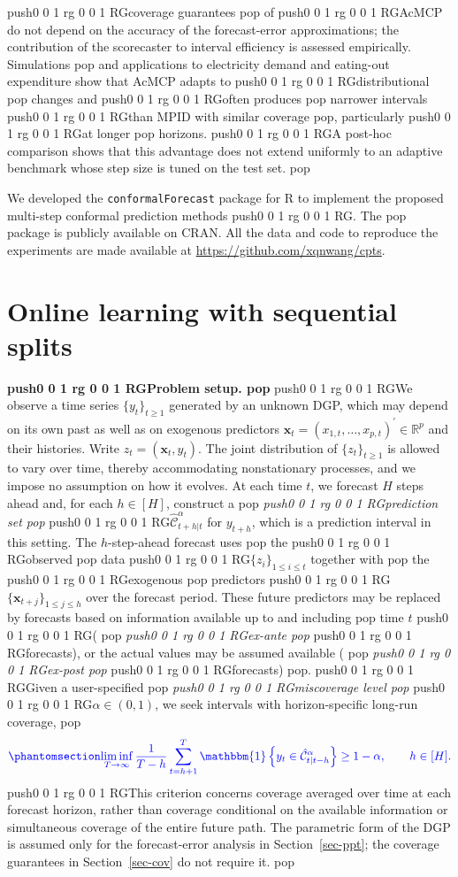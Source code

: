 \documentclass[
  american,
  12pt]{article}
\theoremstyle{plain}
\theoremstyle{plain}
\theoremstyle{remark}
\newcommand{\CPTSadd}[1]{\ifmmode\else\leavevmode\fi\pdfcolorstack 0 push{0 0 1 rg 0 0 1 RG}#1\pdfcolorstack 0 pop}
\begin{document}
\CPTSadd{coverage guarantees} of \CPTSadd{AcMCP do not depend on the accuracy of the
forecast-error approximations; the contribution of the scorecaster to
interval efficiency is assessed empirically. Simulations} and
applications to electricity demand and eating-out expenditure show that
AcMCP adapts to \CPTSadd{distributional} changes and \CPTSadd{often produces} narrower
intervals \CPTSadd{than MPID with similar coverage}, particularly \CPTSadd{at longer}
horizons. \CPTSadd{A post-hoc comparison shows that this advantage does not
extend uniformly to an adaptive benchmark whose step size is tuned on
the test set.}

We developed the \texttt{conformalForecast} package for R to implement
the proposed multi-step conformal prediction methods\CPTSadd{. The} package is
publicly available on CRAN. All the data and code to reproduce the
experiments are made available at \url{https://github.com/xqnwang/cpts}.

\section{Online learning with sequential splits}\label{sec-setup}

\textbf{\CPTSadd{Problem setup.}} \CPTSadd{We observe a time series \(\{y_t\}_{t\geq1}\)
generated by an unknown DGP, which may depend on its own past as well as
on exogenous predictors
\(\bm{x}_t=(x_{1,t},\dots,x_{p,t})^{\prime}\in\mathbb{R}^p\) and their
histories. Write \(z_t=(\bm{x}_t,y_t)\). The joint distribution of
\(\{z_t\}_{t\geq1}\) is allowed to vary over time, thereby accommodating
nonstationary processes, and we impose no assumption on how it evolves.
At each time \(t\), we forecast \(H\) steps ahead and, for each
\(h\in[H]\), construct a} \emph{\CPTSadd{prediction set}}
\CPTSadd{\(\hat{\mathcal{C}}^{\alpha}_{t+h|t}\) for \(y_{t+h}\), which is a
prediction interval in this setting. The \(h\)-step-ahead forecast uses}
the \CPTSadd{observed} data \CPTSadd{\(\{z_i\}_{1\leq i\leq t}\) together with} the
\CPTSadd{exogenous} predictors \CPTSadd{\(\{\bm{x}_{t+j}\}_{1\leq j\leq h}\) over the
forecast period. These future predictors may be replaced by forecasts
based on information available up to and including} time \(t\)
\CPTSadd{(}\emph{\CPTSadd{ex-ante}} \CPTSadd{forecasts), or the actual values may be assumed
available (}\emph{\CPTSadd{ex-post}} \CPTSadd{forecasts)}. \CPTSadd{Given a user-specified}
\emph{\CPTSadd{miscoverage level}} \CPTSadd{\(\alpha\in(0,1)\), we seek intervals with
horizon-specific long-run coverage,}
\begin{equation}\CPTSadd{\phantomsection\label{eq-longrun}{
\liminf_{T\to\infty}\frac{1}{T-h}\sum_{t=h+1}^{T}\mathbbm{1}\left\{y_t\in\hat{\mathcal{C}}^{\alpha}_{t|t-h}\right\}\geq 1-\alpha,\qquad h\in[H].
}}\end{equation} \CPTSadd{This criterion concerns coverage averaged over time at
each forecast horizon, rather than coverage conditional on the available
information or simultaneous coverage of the entire future path. The
parametric form of the DGP is assumed only for the forecast-error
analysis in Section~\ref{sec-ppt}; the coverage guarantees in
Section~\ref{sec-cov} do not require it.}
\end{document}
